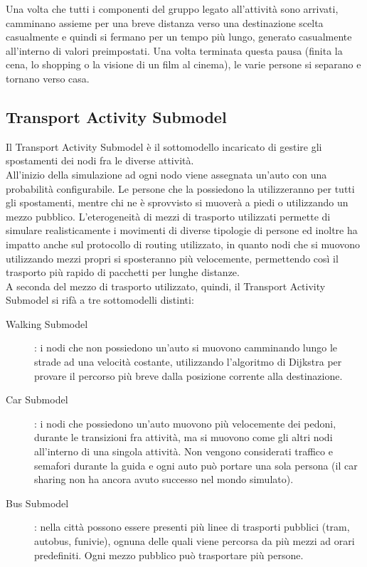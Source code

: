 Una volta che tutti i componenti del gruppo legato all'attività sono arrivati, camminano assieme per una breve distanza verso una destinazione scelta casualmente e quindi si fermano per un tempo più lungo, generato casualmente all'interno di valori preimpostati. Una volta terminata questa pausa (finita la cena, lo shopping o la visione di un film al cinema), le varie persone si separano e tornano verso casa.

\subsection{Transport Activity Submodel}
Il Transport Activity Submodel è il sottomodello incaricato di gestire gli spostamenti dei nodi fra le diverse attività.
\\

All'inizio della simulazione ad ogni nodo viene assegnata un'auto con una probabilità configurabile. Le persone che la possiedono la utilizzeranno per tutti gli spostamenti, mentre chi ne è sprovvisto si muoverà a piedi o utilizzando un mezzo pubblico. L'eterogeneità di mezzi di trasporto utilizzati permette di simulare realisticamente i movimenti di diverse tipologie di persone ed inoltre ha impatto anche sul protocollo di routing utilizzato, in quanto nodi che si muovono utilizzando mezzi propri si sposteranno più velocemente, permettendo così il trasporto più rapido di pacchetti per lunghe distanze.
\\

A seconda del mezzo di trasporto utilizzato, quindi, il Transport Activity Submodel si rifà a tre sottomodelli distinti:
\\

\begin{description}
\item [Walking Submodel]: i nodi che non possiedono un'auto si muovono camminando lungo le strade ad una velocità costante, utilizzando l'algoritmo di Dijkstra per provare il percorso più breve dalla posizione corrente alla destinazione.
\item [Car Submodel]: i nodi che possiedono un'auto muovono più velocemente dei pedoni, durante le transizioni fra attività, ma si muovono come gli altri nodi all'interno di una singola attività. Non vengono considerati traffico e semafori durante la guida e ogni auto può portare una sola persona (il car sharing non ha ancora avuto successo nel mondo simulato).
\item [Bus Submodel]: nella città possono essere presenti più linee di trasporti pubblici (tram, autobus, funivie), ognuna delle quali viene percorsa da più mezzi ad orari predefiniti. Ogni mezzo pubblico può trasportare più persone.
\end{description}


